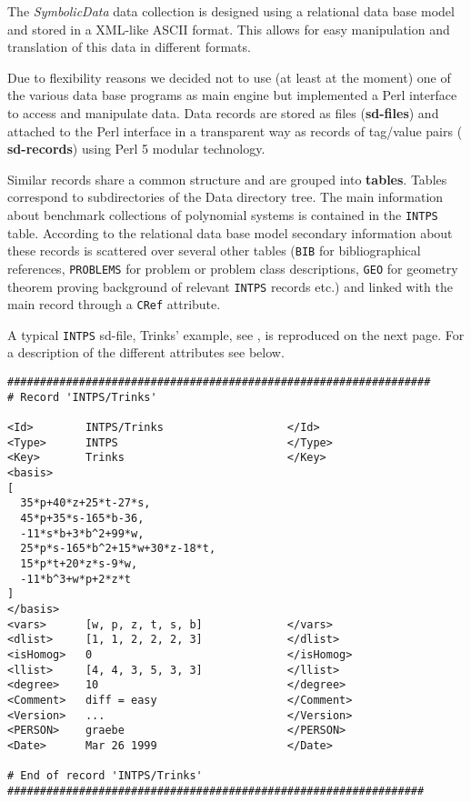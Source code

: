 \documentclass[11pt]{article}
\newcommand{\SD}{{\em Symbo\-lic\-Data}}
\begin{document}
The {\SD} data collection is designed using a relational data base
model and stored in a XML-like ASCII format. This allows for easy
manipulation and translation of this data in different formats. 

Due to flexibility reasons we decided not to use (at least at the
moment) one of the various data base programs as main engine but
implemented a Perl interface to access and manipulate data. Data
records are stored as files ({\bf sd-files}) and attached to the Perl
interface in a transparent way as records of tag/value pairs ({\bf
sd-records}) using Perl 5 modular technology.

Similar records share a common structure and are grouped into {\bf
tables}.  Tables correspond to subdirectories of the Data directory
tree. The main information about benchmark collections of polynomial
systems is contained in the {\tt INTPS} table. According to the
relational data base model secondary information about these records
is scattered over several other tables ({\tt BIB} for
biblio\-graphical references, {\tt PROBLEMS} for problem or problem
class descriptions, {\tt GEO} for geometry theorem proving background
of relevant {\tt INTPS} records etc.) and linked with the main record
through a {\tt CRef} attribute.  

A typical {\tt INTPS} sd-file, Trinks' example, see \cite{Boege_86a},
is reproduced on the next page. For a description of the different
attributes see below.

\begin{table}[ht]
{\small\begin{verbatim}
#################################################################
# Record 'INTPS/Trinks'

<Id>        INTPS/Trinks                   </Id>
<Type>      INTPS                          </Type>
<Key>       Trinks                         </Key>
<basis>
[
  35*p+40*z+25*t-27*s,
  45*p+35*s-165*b-36,
  -11*s*b+3*b^2+99*w,
  25*p*s-165*b^2+15*w+30*z-18*t,
  15*p*t+20*z*s-9*w,
  -11*b^3+w*p+2*z*t
]
</basis>
<vars>      [w, p, z, t, s, b]             </vars>
<dlist>     [1, 1, 2, 2, 2, 3]             </dlist>
<isHomog>   0                              </isHomog>
<llist>     [4, 4, 3, 5, 3, 3]             </llist>
<degree>    10                             </degree>
<Comment>   diff = easy                    </Comment>
<Version>   ...                            </Version>
<PERSON>    graebe                         </PERSON>
<Date>      Mar 26 1999                    </Date>

# End of record 'INTPS/Trinks'
################################################################
\end{verbatim}}
\end{table}
\end{document}
